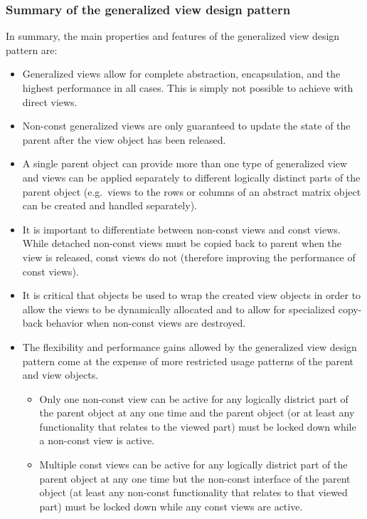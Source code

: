 \documentclass[pdf,ps2pdf,11pt]{SANDreport}
\begin{document}
%
{}\subsubsection*{Summary of the generalized view design pattern}
%

In summary, the main properties and features of the generalized view
design pattern are:

\begin{itemize}

{}\item Generalized views allow for complete abstraction,
encapsulation, and the highest performance in all cases.  This is
simply not possible to achieve with direct views.

{}\item Non-const generalized views are only guaranteed to update the
state of the parent after the view object has been released.

{}\item A single parent object can provide more than one type of
generalized view and views can be applied separately to different
logically distinct parts of the parent object (e.g.\ views to the rows
or columns of an abstract matrix object can be created and handled
separately).

{}\item It is important to differentiate between non-const views and
const views.  While detached non-const views must be copied back to
parent when the view is released, const views do not (therefore
improving the performance of const views).

{}\item It is critical that {} objects be used to wrap the
created view objects in order to allow the views to be dynamically
allocated and to allow for specialized copy-back behavior when
non-const views are destroyed.

{}\item The flexibility and performance gains allowed by the
generalized view design pattern come at the expense of more restricted
usage patterns of the parent and view objects.

  \begin{itemize}

  {}\item Only one non-const view can be active for any logically
  district part of the parent object at any one time and the parent
  object (or at least any functionality that relates to the viewed
  part) must be locked down while a non-const view is active.

  {}\item Multiple const views can be active for any logically
  district part of the parent object at any one time but the non-const
  interface of the parent object (at least any non-const functionality
  that relates to that viewed part) must be locked down while any
  const views are active.

  \end{itemize}

\end{itemize}
\end{document}
